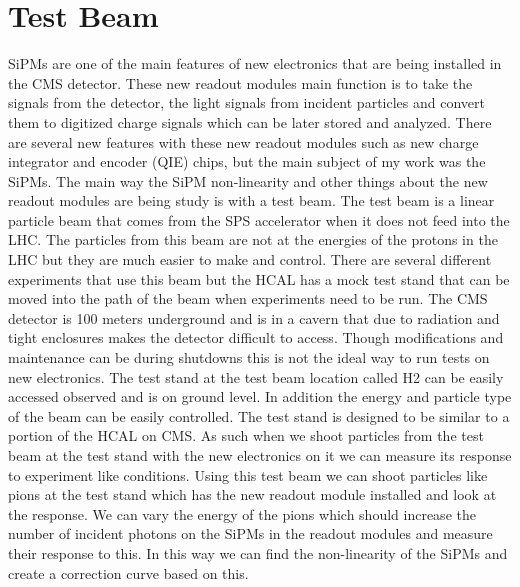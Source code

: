 \section{Test Beam}
SiPMs are one of the main features of new electronics that are being installed in the CMS detector. These new readout modules main function is to take the signals from the detector, the light signals from incident particles and convert them to digitized charge signals which can be later stored and analyzed. There are several new features with these new readout modules such as new charge integrator and encoder (QIE) chips, but the main subject of my work was the SiPMs. The main way the SiPM non-linearity and other things about the new readout modules are being study is with a test beam. The test beam is a linear particle beam that comes from the SPS accelerator when it does not feed into the LHC. The particles from this beam are not at the energies of the protons in the LHC but they are much easier to make and control. There are several different experiments that use this beam but the HCAL has a mock test stand that can be moved into the path of the beam when experiments need to be run. The CMS detector is 100 meters underground and is in a cavern that due to radiation and tight enclosures makes the detector difficult to access. Though modifications and maintenance can be during shutdowns this is not the ideal way to run tests on new electronics. The test stand at the test beam location called H2 can be easily accessed observed and is on ground level. In addition the energy and particle type of the beam can be easily controlled. The test stand is designed to be similar to a portion of the HCAL on CMS. As such when we shoot particles from the test beam at the test stand with the new electronics on it we can measure its response to experiment like conditions. Using this test beam we can shoot particles like pions at the test stand which has the new readout module installed and look at the response. We can vary the energy of the pions which should increase the number of incident photons on the SiPMs in the readout modules and measure their response to this. In this way we can find the non-linearity of the SiPMs and create a correction curve based on this.

